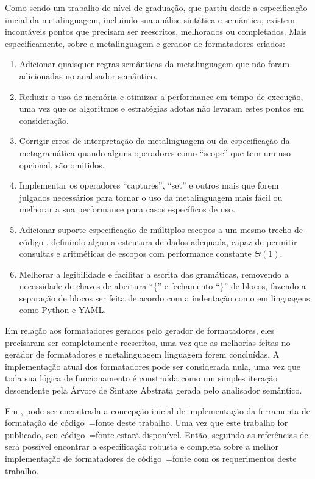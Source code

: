 Como sendo um trabalho de nível de graduação,
que partiu desde a especificação inicial da metalinguagem,
incluindo sua análise sintática e
semântica,
existem incontáveis pontos que precisam ser reescritos,
melhorados ou completados. Mais especificamente,
sobre a metalinguagem e
gerador de formatadores criados:
\begin{enumerate}
\item Adicionar quaisquer regras semânticas da metalinguagem que não foram adicionadas no analisador semântico.
\item Reduzir o uso de memória e
otimizar a performance em tempo de execução,
uma vez que os algoritmos e
estratégias adotas não levaram estes pontos em consideração.
\item Corrigir erros de interpretação da metalinguagem ou
da especificação da metagramática quando alguns operadores como ``scope'' que tem um uso opcional,
são omitidos.
\item Implementar os operadores ``captures'',
``set'' e
outros mais que forem julgados necessários para tornar o uso da metalinguagem mais fácil ou
melhorar a sua performance para casos específicos de uso.
\item Adicionar suporte especificação de múltiplos escopos a um mesmo trecho de código \cite{vsCodeSyntaxHighlighthing},
definindo alguma estrutura de dados adequada,
capaz de permitir consultas e
aritméticas de escopos \cite{textMateScopeExclusion} com performance constante $\Theta(1)$.
\item Melhorar a legibilidade e
facilitar a escrita das gramáticas,
removendo a necessidade de chaves de abertura ``\{'' e
fechamento ``\}'' de blocos,
fazendo a separação de blocos ser feita de acordo com a indentação como em linguagens como Python e
YAML.
\end{enumerate}%

Em relação aos formatadores gerados pelo gerador de formatadores,
eles precisaram ser completamente reescritos,
uma vez que as melhorias feitas no gerador de formatadores e
metalinguagem linguagem forem concluídas.
A implementação atual dos formatadores pode ser considerada nula,
uma vez que toda sua lógica de funcionamento é construída como um simples iteração descendente pela Árvore de Sintaxe Abstrata gerada pelo analisador semântico.

Em ,
pode ser encontrada a concepção inicial de implementação da ferramenta de formatação de código~=fonte deste trabalho.
Uma vez que este trabalho for publicado,
seu código~=fonte estará disponível.
Então,
seguindo as referências de  será possível encontrar a especificação robusta e
completa sobre a melhor implementação de formatadores de código~=fonte com os requerimentos deste trabalho.

